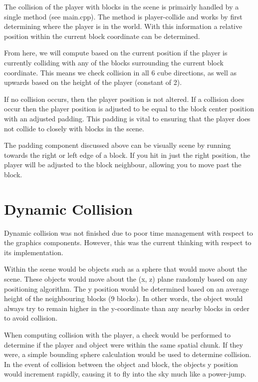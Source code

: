 \documentclass{book}
\begin{document}
The collision of the player with blocks in the scene is primairly handled by a single method (see main.cpp).  The method is player-collide and works by first determining where the player is in the world.  With this information a relative position within the current block coordinate can be determined.  
    
From here, we will compute based on the current position if the player is currently colliding with any of the blocks surrounding the current block coordinate.  This means we check collision in all 6 cube directions, as well as upwards based on the height of the player (constant of 2).
    
If no collision occurs, then the player position is not altered.  If a collision does occur then the player position is adjusted to be equal to the block center position with an adjusted padding.  This padding is vital to ensuring that the player does not collide to closely with blocks in the scene.
    
The padding component discussed above can be visually scene by running towards the right or left edge of a block.  If you hit in just the right position, the player will be adjusted to the block neighbour, allowing you to move past the block.
    
\section{Dynamic Collision}
    
Dynamic collision was not finished due to poor time management with respect to the graphics components.  However, this was the current thinking with respect to its implementation.
    
Within the scene would be objects such as a sphere that would move about the scene.  These objects would move about the (x, z) plane randomly based on any positioning algorithm.  The y position would be determined based on an average height of the neighbouring blocks (9 blocks).  In other words, the object would always try to remain higher in the y-coordinate than any nearby blocks in order to avoid collision.
    
When computing collision with the player, a check would be performed to determine if the player and object were within the same spatial chunk.  If they were, a simple bounding sphere calculation would be used to determine collision.  In the event of collision between the object and block, the objects y position would increment rapidly, causing it to fly into the sky much like a power-jump.  
    
\end{document}
